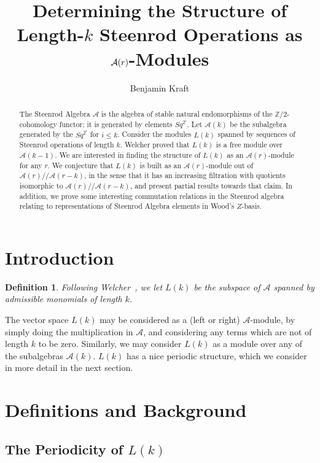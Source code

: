 \documentclass{article}
\title{Determining the Structure of Length-$k$ Steenrod Operations as $\A(r)$-Modules}
\author{Benjamin Kraft}
\newcommand{\A}{\mathcal{A}}
\newcommand{\mmod}{/\!/\!}
\newtheorem{defn}{Definition}
\begin{document}
\begin{abstract}
  The Steenrod Algebra $\A$ is the algebra of stable natural endomorphisms of the $\mathbb{Z}/2$-cohomology functor; it is generated by elements $Sq^{2^i}$.  Let $\A(k)$ be the subalgebra generated by the $Sq^{2^i}$ for $i\leq k$.  Consider the modules $L(k)$ spanned by sequences of Steenrod operations of length $k$.  Welcher proved that $L(k)$ is a free module over $\A(k-1)$.  We are interested in finding the structure of $L(k)$ as an $\A(r)$-module for any $r$.  We conjecture that $L(k)$ is built as an $\A(r)$-module out of $\A(r)\mmod\A(r-k)$, in the sense that it has an increasing filtration with quotients isomorphic to $\A(r)\mmod\A(r-k)$, and present partial results towards that claim.  In addition, we prove some interesting commutation relations in the Steenrod algebra relating to representations of Steenrod Algebra elements in Wood's $Z$-basis.
\end{abstract}

\section{Introduction}

\begin{defn}
  Following Welcher~\cite{TODO}, we let $L(k)$ be the subspace of $\A$ spanned by admissible monomials of length $k$.
\end{defn}

The vector space $L(k)$ may be considered as a (left or right) $\A$-module, by simply doing the multiplication in $\A$, and considering any terms which are not of length $k$ to be zero.  Similarly, we may consider $L(k)$ as a module over any of the subalgebras $\A(k)$.  $L(k)$ has a nice periodic structure, which we consider in more detail in the next section.



\section{Definitions and Background}

\subsection{The Periodicity of \boldmath$L(k)$}
\end{document}
